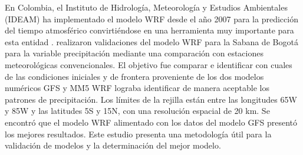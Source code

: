 En Colombia, el Instituto de Hidrología, Meteorología y Estudios Ambientales (IDEAM) ha implementado el modelo WRF desde el año 2007 para la predicción del tiempo atmosférico convirtiéndose en una herramienta muy importante para esta entidad \citep{Arango2011}. \citet{Mejia2012} realizaron validaciones del modelo WRF para la Sabana de Bogotá para la variable precipitación mediante una comparación con estaciones meteorológicas convencionales. El objetivo fue comparar e identificar con cuales de las condiciones iniciales y de frontera proveniente de los dos modelos numéricos GFS \citep{NOAA2016} y MM5 WRF lograba identificar de manera aceptable los patrones de precipitación. Los límites de la rejilla están entre las longitudes 65\degree W y 85\degree W y las latitudes 5\degree S y 15\degree N, con una resolución espacial de 20 km. Se encontró que el modelo WRF alimentado con los datos del modelo GFS presentó los mejores resultados. Este estudio presenta una metodología útil para la validación de modelos y la determinación del mejor modelo.\\



